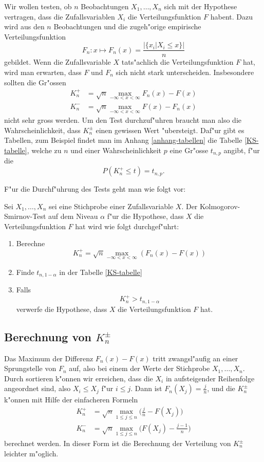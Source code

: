 Wir wollen testen, ob $n$ Beobachtungen $X_1,\dots,X_n$ sich mit
der Hypothese vertragen, dass die Zufallsvariablen $X_i$ die
Verteilungsfunktion $F$ habent. Dazu wird aus den $n$ Beobachtungen
und die zugeh"orige empirische Verteilungsfunktion
\[
F_n\colon x\mapsto F_n(x)=\frac{|\{x_i|X_i\le x\}|}{n}
\]
gebildet. Wenn die Zufallsvariable $X$ tats"achlich die
Verteilungsfunktion $F$ hat, wird man erwarten,
dass $F$ und $F_n$ sich nicht stark unterscheiden.
Insbesondere sollten die Gr"ossen
\begin{align}
K_n^+
&=
\sqrt{n}\max_{-\infty<x<\infty} F_n(x)-F(x)
\\
K_n^-
&=
\sqrt{n}\max_{-\infty<x<\infty} F(x)-F_n(x)
\end{align}
nicht sehr gross werden. Um den Test durchzuf"uhren braucht man also
die Wahrscheinlichkeit, dass $K_n^{\pm}$ einen gewissen Wert "ubersteigt.
Daf"ur gibt es Tabellen, zum Beispiel findet man im Anhang \ref{anhang-tabellen}
die Tabelle \ref{KS-tabelle}, welche zu $n$ und einer Wahrscheinlichkeit
$p$ eine Gr"osse $t_{n,p}$ angibt, f"ur die
\[
P(K_n^+\le t)=t_{n,p}.
\]

F"ur die Durchf"uhrung des Tests geht man wie folgt vor:
\begin{satz} Sei $X_1,\dots,X_n$ sei eine Stichprobe einer Zufallsvariable $X$.
Der Kolmogorov-Smirnov-Test auf dem Niveau $\alpha$ f"ur die Hypothese,
dass $X$ die Verteilungsfunktion $F$ hat wird wie folgt durchgef"uhrt:
\begin{enumerate}
\item Berechne
\[
K_n^+ = \sqrt{n}\max_{-\infty<x<\infty} (F_n(x)-F(x))
\]
\item Finde $t_{n,1-\alpha}$ in der Tabelle \ref{KS-tabelle}
\item Falls
\[
K_n^+>t_{n,1-\alpha}
\]
verwerfe die Hypothese, dass $X$ die Verteilungsfunktion $F$ hat.
\end{enumerate}
\end{satz}

\subsection{Berechnung von \texorpdfstring{$K_n^{\pm}$}{Kn-plus-minus}}
Das Maximum der Differenz $F_n(x)-F(x)$ tritt zwangsl"aufig an einer
Sprungstelle von $F_n$ auf, also bei einem der Werte der Stichprobe
$X_1,\dots,X_n$. Durch sortieren k"onnen wir erreichen, dass die
$X_i$  in aufsteigender Reihenfolge angeordnet sind, also $X_i\le X_j$
f"ur $i\le j$. Dann ist $F_n(X_j)=\frac{j}{n}$, und
die  $K_n^{\pm}$ k"onnen mit Hilfe der einfacheren Formeln
\begin{align}
K_n^+
&=
\sqrt{n}\max_{1\le j\le n}\biggl(\frac{j}{n}-F(X_j)\biggr)
\label{knp-berechnungs-formel}
\\
K_n^-
&=
\sqrt{n}\max_{1\le j\le n}\biggl(F(X_j)-\frac{j-1}n\biggr)
\end{align}
berechnet werden. In dieser Form ist die Berechnung der
Verteilung von $K_n^{\pm}$ leichter m"oglich.


